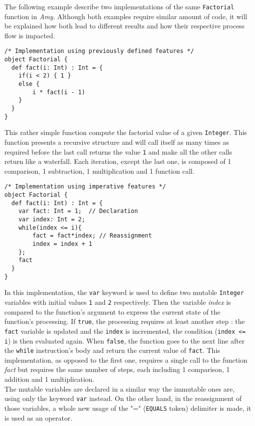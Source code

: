 The following example describe two implementations of the same \texttt{Factorial} function in \textsl{Amy}. Although both examples require similar amount of code, it will be explained how both lead to different results and how their respective process flow is impacted.

\begin{lstlisting}
/* Implementation using previously defined features */
object Factorial {
  def fact(i: Int) : Int = { 
    if(i < 2) { 1 }
    else {
        i * fact(i - 1)
    }
  }
}
\end{lstlisting}
This rather simple function compute the factorial value of a given \texttt{Integer}. This function presents a recursive structure and will call itself as many times as required before the last call returns the value \texttt{1} and make all the other calls return like a waterfall. Each iteration, except the last one, is composed of 1 comparison, 1 subtraction, 1 multiplication and 1 function call.
\newpage
\begin{lstlisting}
/* Implementation using imperative features */
object Factorial {
  def fact(i: Int) : Int = { 
    var fact: Int = 1;  // Declaration
    var index: Int = 2;
    while(index <= i){
        fact = fact*index; // Reassignment
        index = index + 1
    };
    fact    
  } 
}
\end{lstlisting}
In this implementation, the \texttt{var} keyword is used to define two mutable \texttt{Integer} variables with initial values \texttt{1} and \texttt{2} respectively. Then the variable \textsl{index} is compared to the function's argument to express the current state of the function's processing. If \texttt{true}, the processing requires at least another step : the \texttt{fact} variable is updated and the \texttt{index} is incremented, the condition (\texttt{index <= i}) is then evaluated again. When \texttt{false}, the function goes to the next line after the \texttt{while} instruction's body and return the current value of \texttt{fact}.
This implementation, as opposed to the first one, requires a single call to the function \textsl{fact} but requires the same number of steps, each including 1 comparison, 1 addition and 1 multiplication. \\

The mutable variables are declared in a similar way the immutable ones are, using only the keyword \texttt{var} instead. On the other hand, in the reassignment of those variables, a whole new usage of the "=" (\texttt{EQUALS} token) delimiter is made, it is used as an operator.


